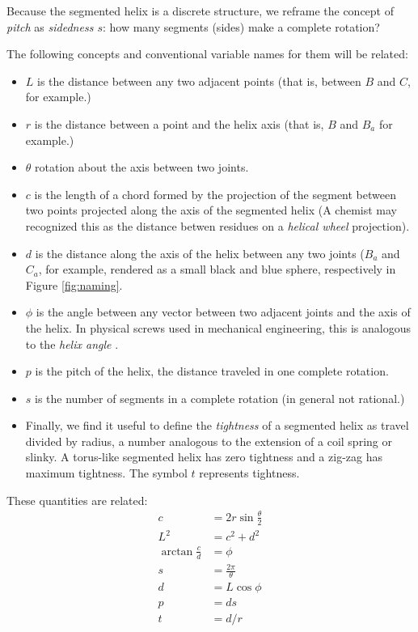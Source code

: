 \documentclass[11pt]{article}
\begin{document}
{Because the segmented helix is a discrete structure, we reframe the concept of {\em pitch} as {\em sidedness $s$}: how many segments (sides)
make a complete rotation?

The following concepts and conventional variable names for them will be related:
\begin{itemize}
\item $L$ is the distance between any two adjacent points (that is, between $B$ and $C$, for example.)
  \item $r$ is the distance between a point and the helix axis (that is, $B$ and $B_a$ for example.)
  \item $\theta$ rotation about the axis between two joints.
  \item $c$ is the length of a chord formed by the projection of the segment between two points projected along the axis of the segmented helix (A chemist may recognized this as the distance betwen residues on a {\em helical wheel} projection).
  \item $d$ is the distance along the axis of the helix between any two joints ($B_a$ and $C_a$, for example, rendered as a small black and blue
    sphere, respectively in Figure \ref{fig:naming}.
\item $\phi$ is the angle between any vector between two adjacent joints and the axis of the helix. In physical screws used in mechanical engineering, this is analogous to the {\em helix angle} \cite{wiki:helixangle}.
  \item $p$ is the pitch of the helix, the distance traveled in one complete rotation.
  \item $s$ is the number of segments in a complete rotation (in general not rational.)
\item  Finally, we find it useful to define the {\em tightness} of a segmented helix
as travel divided by radius, a number
analogous to the extension of a coil spring or slinky.
A torus-like segmented helix has zero tightness and a zig-zag has
maximum tightness. The symbol $t$ represents tightness.

  \end{itemize}
These quantities are related:
\begin{align}
    c &= 2r\sin{\frac{\theta}{2}} \\
    L^2 &= c^2+d^2  \\
    \arctan{\frac{c}{d}}  &= \phi \\
    s &= \frac{2 \pi}{\theta} \\
    d &= L \cos{\phi} \\
    p &= d s \\
    t &= d / r \\
\end{align}

}
\end{document}
